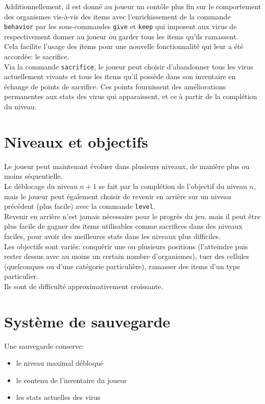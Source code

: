 \documentclass[a4paper,french]{article}
\begin{document}
Additionnellement, il est donn\'e au joueur un cont\^ole plus fin sur le comportement des organismes
vis-\`a-vis des items avec l'enrichissement de la commande \texttt{behavior} par les sous-commandes
\texttt{give} et \texttt{keep} qui imposent aux virus de respectivement donner au joueur ou garder 
tous les items qu'ils ramassent.\\
Cela facilite l'usage des items pour une nouvelle fonctionnalit\'e qui leur a \'et\'e accord\'ee: le sacrifice.\\
Via la commande \texttt{sacrifice}, le joueur peut choisir d'abandonner tous les virus actuellement vivants et tous
les items qu'il poss\`ede dans son inventaire en \'echange de points de sacrifice. Ces points fournissent des am\'eliorations
permanentes aux stats des virus qui apparaissent, et ce \`a partir de la compl\'etion du niveau.

\section{Niveaux et objectifs}
Le joueur peut maintenant \'evoluer dans plusieurs niveaux, de mani\`ere plus ou moins s\'equentielle.\\
Le d\'eblocage du niveau \(n+1\) se fait par la compl\'etion de l'objectif du niveau \(n\), mais le joueur peut \'egalement
choisir de revenir en arri\`ere sur un niveau pr\'ec\'edent (plus facile) avec la commande \texttt{level}.\\
Revenir en arri\`ere n'est jamais n\'ecessaire pour le progr\`es du jeu, mais il peut \^etre plus facile de gagner des items
utilisables comme sacrifices dans des niveaux faciles, pour avoir des meilleures stats dans les niveaux plus difficiles.\\

Les objectifs sont vari\'es: conqu\'erir une ou plusieurs positions (l'atteindre puis rester dessus avec au moins un certain nombre d'organismes),
tuer des cellules (quelconques ou d'une cat\'egorie particuli\`ere), ramasser des items d'un type particulier.\\
Ils sont de difficult\'e approximativement croissante.\\

\section{Syst\`eme de sauvegarde}
Une sauvegarde conserve:
\begin{itemize}
    \item le niveau maximal d\'ebloqu\'e
    \item le contenu de l'inventaire du joueur
    \item les stats actuelles des virus
\end{itemize}
\end{document}
